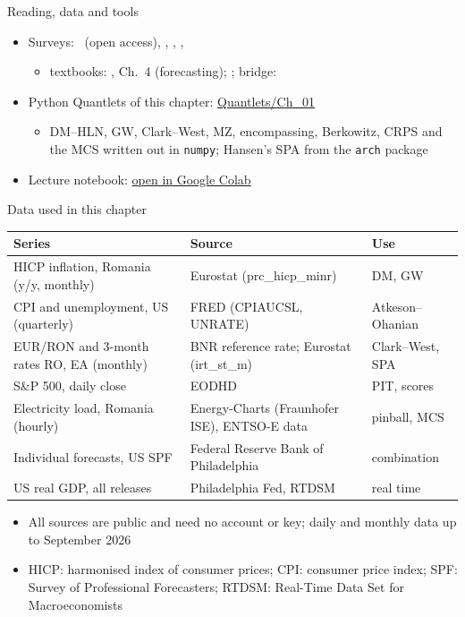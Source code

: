 \begin{frame}{Reading, data and tools}
\itemsize{\small}
\begin{itemize}
    \item Surveys: \ (open access), , , , 
    \begin{itemize}
        \item textbooks: , Ch.~4 (forecasting); ; bridge: 
    \end{itemize}
    \item Python Quantlets of this chapter: \href{https://github.com/danpele/Advanced-Time-Series/tree/main/Quantlets/Ch_01}{Quantlets/Ch\_01}
    \begin{itemize}
        \item DM--HLN, GW, Clark--West, MZ, encompassing, Berkowitz, CRPS and the MCS written out in \texttt{numpy}; Hansen's SPA from the \texttt{arch} package
    \end{itemize}
    \item Lecture notebook: \href{\colaburl{notebooks/EN/chapter1_lecture_notebook.ipynb}}{open in Google Colab}
\end{itemize}
\end{frame}

\begin{frame}{Data used in this chapter}
\itemsize{\footnotesize}
\begin{center}
\scriptsize
\begin{tabular}{>{\raggedright\arraybackslash}p{4.2cm}>{\raggedright\arraybackslash}p{4.6cm}>{\raggedright\arraybackslash}p{2.6cm}}
\toprule
\textbf{Series} & \textbf{Source} & \textbf{Use} \\
\midrule
HICP inflation, Romania (y/y, monthly) & Eurostat (prc\_hicp\_minr) & DM, GW \\
CPI and unemployment, US (quarterly) & FRED (CPIAUCSL, UNRATE) & Atkeson--Ohanian \\
EUR/RON and 3-month rates RO, EA (monthly) & BNR reference rate; Eurostat (irt\_st\_m) & Clark--West, SPA \\
S\&P 500, daily close & EODHD & PIT, scores \\
Electricity load, Romania (hourly) & Energy-Charts (Fraunhofer ISE), ENTSO-E data & pinball, MCS \\
Individual forecasts, US SPF & Federal Reserve Bank of Philadelphia & combination \\
US real GDP, all releases & Philadelphia Fed, RTDSM & real time \\
\bottomrule
\end{tabular}
\end{center}
\begin{itemize}
    \item All sources are public and need no account or key; daily and monthly data up to September 2026
    \item HICP: harmonised index of consumer prices; CPI: consumer price index; SPF: Survey of Professional Forecasters; RTDSM: Real-Time Data Set for Macroeconomists
\end{itemize}
\end{frame}

